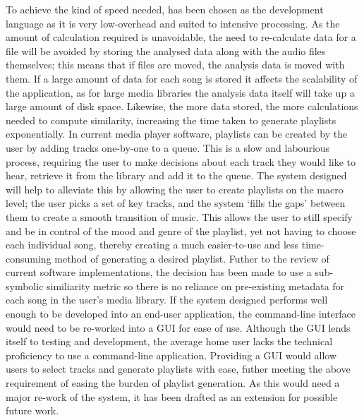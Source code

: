 To achieve the kind of speed needed,  has been chosen as the development language as it is very low-overhead and suited to intensive processing. As the amount of calculation required is unavoidable, the need to re-calculate data for a file will be avoided by storing the analysed data along with the audio files themselves; this means that if files are moved, the analysis data is moved with them.
\label{text:spec:requirement:data}
If a large amount of data for each song is stored it affects the scalability of the application, as for large media libraries the analysis data itself will take up a large amount of disk space. Likewise, the more data stored, the more calculations needed to compute similarity, increasing the time taken to generate playlists exponentially.
In current media player software, playlists can be created by the user by adding tracks one-by-one to a queue. This is a slow and labourious process, requiring the user to make decisions about each track they would like to hear, retrieve it from the library and add it to the queue. The system designed will help to alleviate this by allowing the user to create playlists on the macro level; the user picks a set of key tracks, and the system `fills the gaps' between them to create a smooth transition of music. This allows the user to still specify and be in control of the mood and genre of the playlist, yet not having to choose each individual song, thereby creating a much easier-to-use and less time-consuming method of generating a desired playlist.
Futher to the review of current software implementations, the decision has been made to use a sub-symbolic similiarity metric so there is no reliance on pre-existing metadata for each song in the user's media library.
If the system designed performs well enough to be developed into an end-user application, the command-line interface would need to be re-worked into a GUI for ease of use. Although the GUI lends itself to testing and development, the average home user lacks the technical proficiency to use a command-line application. Providing a GUI would allow users to select tracks and generate playlists with ease, futher meeting the above requirement of easing the burden of playlist generation. As this would need a major re-work of the system, it has been drafted as an extension for possible future work.
